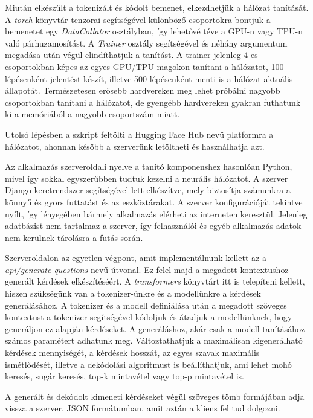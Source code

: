 Miután elkészült a tokenizált és kódolt bemenet, elkezdhetjük a hálózat tanítását. A \textit{torch} könyvtár tenzorai segítségével különböző csoportokra bontjuk a bemenetet egy \textit{DataCollator} osztályban, így lehetővé téve a GPU-n vagy TPU-n való párhuzamosítást. A \textit{Trainer} osztály segítségével és néhány argumentum megadása után végül elindíthatjuk a tanítást. A trainer jelenleg 4-es csoportokban képes az egyes GPU/TPU magokon tanítani a hálózatot, 100 lépésenként jelentést készít, illetve 500 lépésenként menti is a hálózat aktuális állapotát. Természetesen erősebb hardvereken meg lehet próbálni nagyobb csoportokban tanítani a hálózatot, de gyengébb hardvereken gyakran futhatunk ki a memóriából a nagyobb csoportszám miatt.

Utolsó lépésben a szkript feltölti a Hugging Face Hub nevű platformra a hálózatot, ahonnan később a szerverünk letöltheti és használhatja azt.


Az alkalmazás szerveroldali nyelve a tanító komponenshez hasonlóan Python, mivel így sokkal egyszerűbben tudtuk kezelni a neurális hálózatot. A szerver Django keretrendszer segítségével lett elkészítve, mely biztosítja számunkra a könnyű és gyors futtatást és az eszköztárakat. A szerver konfigurációját tekintve nyílt, így lényegében bármely alkalmazás elérheti az interneten keresztül. Jelenleg adatbázist nem tartalmaz a szerver, így felhasználói és egyéb alkalmazás adatok nem kerülnek tárolásra a futás során.

Szerveroldalon az egyetlen végpont, amit implementálnunk kellett az a \\
\textit{api/generate-questions} nevű útvonal. Ez felel majd a megadott kontextushoz generált kérdések elkészítéséért. A \textit{transformers} könyvtárt itt is telepíteni kellett, hiszen szükségünk van a tokenizer-ünkre és a modellünkre a kérdések generálásához. A tokenizer és a modell definiálása után a megadott szöveges kontextust a tokenizer segítségével kódoljuk és átadjuk a modellünknek, hogy generáljon ez alapján kérdéseket. A generáláshoz, akár csak a modell tanításához számos paramétert adhatunk meg. Változtathatjuk a maximálisan kigenerálható kérdések mennyiségét, a kérdések hosszát, az egyes szavak maximális ismétlődését, illetve a dekódolási algoritmust is beállíthatjuk, ami lehet mohó keresés, sugár keresés, top-k mintavétel vagy top-p mintavétel is.

A generált és dekódolt kimeneti kérdéseket végül szöveges tömb formájában adja vissza a szerver, JSON formátumban, amit aztán a kliens fel tud dolgozni.

